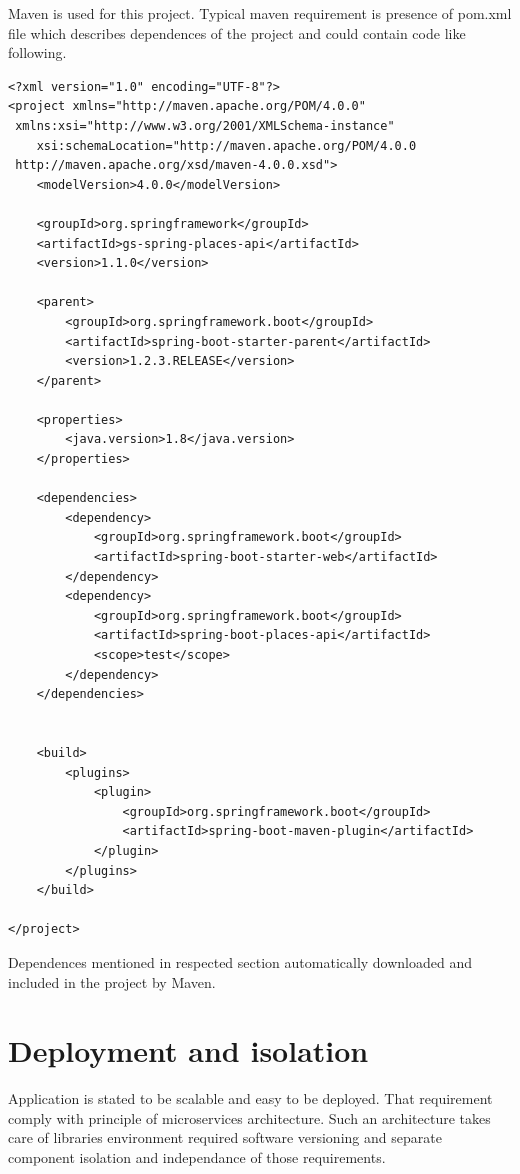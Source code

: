 \documentclass[thesis=M,english]{FITthesis}[2012/10/20]
\begin{document}
Maven is used for this project. Typical maven requirement is presence of pom.xml file which describes dependences of the project and could contain code like following.

\begin{lstlisting}
<?xml version="1.0" encoding="UTF-8"?>
<project xmlns="http://maven.apache.org/POM/4.0.0"
 xmlns:xsi="http://www.w3.org/2001/XMLSchema-instance"
    xsi:schemaLocation="http://maven.apache.org/POM/4.0.0
 http://maven.apache.org/xsd/maven-4.0.0.xsd">
    <modelVersion>4.0.0</modelVersion>

    <groupId>org.springframework</groupId>
    <artifactId>gs-spring-places-api</artifactId>
    <version>1.1.0</version>

    <parent>
        <groupId>org.springframework.boot</groupId>
        <artifactId>spring-boot-starter-parent</artifactId>
        <version>1.2.3.RELEASE</version>
    </parent>

    <properties>
        <java.version>1.8</java.version>
    </properties>

    <dependencies>
        <dependency>
            <groupId>org.springframework.boot</groupId>
            <artifactId>spring-boot-starter-web</artifactId>
        </dependency>
        <dependency>
            <groupId>org.springframework.boot</groupId>
            <artifactId>spring-boot-places-api</artifactId>
            <scope>test</scope>
        </dependency>
    </dependencies>


    <build>
        <plugins>
            <plugin>
                <groupId>org.springframework.boot</groupId>
                <artifactId>spring-boot-maven-plugin</artifactId>
            </plugin>
        </plugins>
    </build>

</project>
\end{lstlisting}

Dependences mentioned in respected section automatically downloaded and included in the project by Maven.



\section{Deployment and isolation}

Application is stated to be scalable and easy to be deployed. That requirement comply with principle of microservices architecture. Such an architecture takes care of libraries environment required software versioning and separate component isolation and independance of those requirements.
\end{document}
